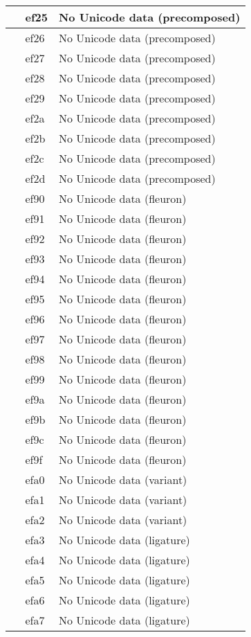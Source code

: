 \documentclass[12pt,letterpaper,openany]{book}
\begin{document}
\begin{center}
\begin{supertabular}{|m{0.25in}|m{0.5in}|m{4in}|}
 & ef25 & No Unicode data (precomposed)\\\hline
 & ef26 & No Unicode data (precomposed)\\\hline
 & ef27 & No Unicode data (precomposed)\\\hline
 & ef28 & No Unicode data (precomposed)\\\hline
 & ef29 & No Unicode data (precomposed)\\\hline
 & ef2a & No Unicode data (precomposed)\\\hline
 & ef2b & No Unicode data (precomposed)\\\hline
 & ef2c & No Unicode data (precomposed)\\\hline
 & ef2d & No Unicode data (precomposed)\\\hline
 & ef90 & No Unicode data (fleuron)\\\hline
 & ef91 & No Unicode data (fleuron)\\\hline
 & ef92 & No Unicode data (fleuron)\\\hline
 & ef93 & No Unicode data (fleuron)\\\hline
 & ef94 & No Unicode data (fleuron)\\\hline
 & ef95 & No Unicode data (fleuron)\\\hline
 & ef96 & No Unicode data (fleuron)\\\hline
 & ef97 & No Unicode data (fleuron)\\\hline
 & ef98 & No Unicode data (fleuron)\\\hline
 & ef99 & No Unicode data (fleuron)\\\hline
 & ef9a & No Unicode data (fleuron)\\\hline
 & ef9b & No Unicode data (fleuron)\\\hline
 & ef9c & No Unicode data (fleuron)\\\hline
 & ef9f & No Unicode data (fleuron)\\\hline
 & efa0 & No Unicode data (variant)\\\hline
 & efa1 & No Unicode data (variant)\\\hline
 & efa2 & No Unicode data (variant)\\\hline
 & efa3 & No Unicode data (ligature)\\\hline
 & efa4 & No Unicode data (ligature)\\\hline
 & efa5 & No Unicode data (ligature)\\\hline
 & efa6 & No Unicode data (ligature)\\\hline
 & efa7 & No Unicode data (ligature)\\\hline

\end{supertabular}
\end{center}
\end{document}
